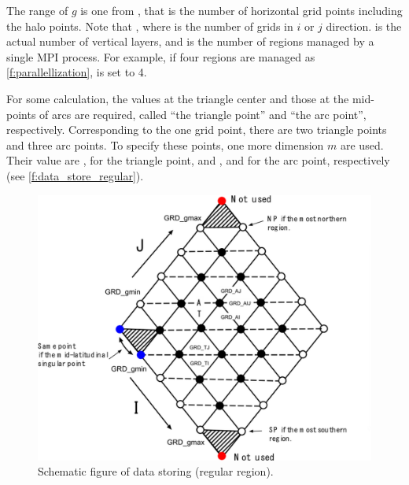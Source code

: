 The range of $g$ is one from , that is the number of
horizontal grid points including the halo points.
%
Note that ,
where  is the number of grids in $i$ or $j$ direction.
%
 is the actual number of vertical layers, and
 is the number of regions managed by a single MPI process.
%
For example, if four regions are managed as \autoref{f:parallellization},
 is set to 4.

For some calculation, the values at the triangle center and those at the
mid-points of arcs are required, called ``the triangle point'' and ``the
arc point'', respectively.
%
Corresponding to the one grid point, there are two triangle points and
three arc points.
%
To specify these points, one more dimension $m$ are used. Their value
are ,  for the triangle point, and ,
 and  for the arc point, respectively (see
\autoref{f:data_store_regular}).





\begin{figure}[htbp]
 \centering
\includegraphics[scale=.5]{figs/Tomita2-12-0.png}
\caption{Schematic figure of data storing (regular region).}%
\label{f:data_store_regular}
\end{figure}



